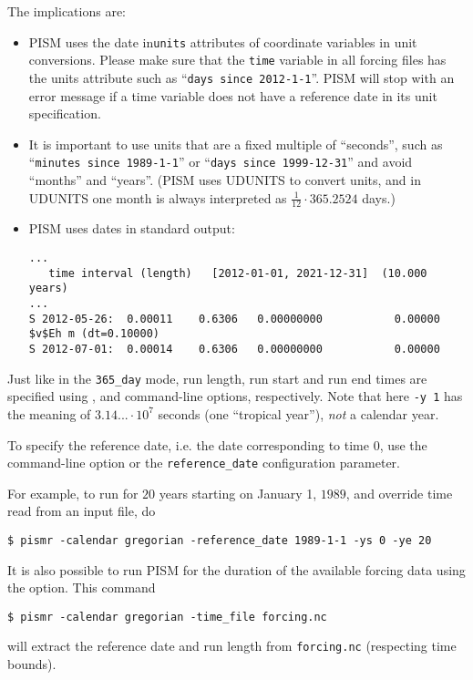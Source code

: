 \documentclass[titlepage,letterpaper,final]{scrartcl}
\begin{document}
The implications are:
\begin{itemize}
\item PISM uses the date in\texttt{units} attributes of coordinate variables in
  unit conversions. Please make sure that the \texttt{time} variable in all
  forcing files has the units attribute such as ``\texttt{days since
    2012-1-1}''. PISM will stop with an error message if a time variable does
  not have a reference date in its unit specification.
\item It is important to use units that are a fixed multiple of ``seconds'',
  such as ``\texttt{minutes since 1989-1-1}'' or ``\texttt{days since
    1999-12-31}'' and avoid ``months'' and ``years''. (PISM uses UDUNITS to
  convert units, and in UDUNITS one month is always interpreted as
  $\frac{1}{12}\cdot 365.2524$ days.)
\item PISM uses dates in standard output:
\begin{verbatim}
...
   time interval (length)   [2012-01-01, 2021-12-31]  (10.000 years)
...
S 2012-05-26:  0.00011    0.6306   0.00000000           0.00000
$v$Eh m (dt=0.10000)
S 2012-07-01:  0.00014    0.6306   0.00000000           0.00000
\end{verbatim}
\end{itemize}

Just like in the \texttt{365_day} mode, run length, run start and run end times
are specified using ,  and 
command-line options, respectively. Note that here \texttt{-y 1} has the
meaning of $3.14...\cdot 10^{7}$ seconds (one ``tropical year''), \emph{not} a
calendar year.

To specify the reference date, i.e. the date corresponding to time $0$, use the
 command-line option or the
\texttt{reference_date} configuration parameter.

For example, to run for $20$ years starting on January 1, $1989$, and override time read from an input file, do
\begin{verbatim}
$ pismr -calendar gregorian -reference_date 1989-1-1 -ys 0 -ye 20
\end{verbatim} %

It is also possible to run PISM for the duration of the available forcing data using the  option.
This command
\begin{verbatim}
$ pismr -calendar gregorian -time_file forcing.nc
\end{verbatim} %
will extract the reference date and run length from \texttt{forcing.nc} (respecting time bounds).
\end{document}
